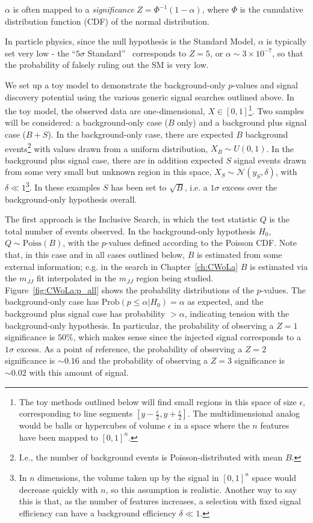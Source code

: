 $\alpha$ is often mapped to a \textit{significance} $Z=\Phi^{-1}(1-\alpha)$, where $\Phi$ is the cumulative distribution function (CDF) of the normal distribution.

In particle physics, since the null hypothesis is the Standard Model, $\alpha$ is typically set very low - the ``$5\sigma$ Standard''~\cite{Lyons:2013yja,Sinervo:2002sa} corresponds to $Z=5$, or $\alpha \sim 3\times10^{-7}$, so that the probability of falsely ruling out the SM is very low.

We set up a toy model to demonstrate the background-only $p$-values and signal discovery potential using the various generic signal searches outlined above.
In the toy model, the observed data are one-dimensional, $X \in [0,1]$\footnote{The toy methods outlined below will find small regions in this space of size $\epsilon$, corresponding to line segments $[y-\frac{\epsilon}{2},y+\frac{\epsilon}{2}]$. The multidimensional analog would be balls or hypercubes of volume $\epsilon$ in a space where the $n$ features have been mapped to $[0,1]^n$.}.
Two samples will be considered: a background-only case ($B$ only) and a background plus signal case ($B+S$).
In the background-only case, there are expected $B$ background events\footnote{I.e., the number of background events is Poisson-distributed with mean $B$.} with values drawn from a uniform distribution, $X_B\sim U(0,1)$.
In the background plus signal case, there are in addition expected $S$ signal events drawn from some very small but unknown region in this space, $X_S\sim\mathcal{N}(y_S,\delta)$, with $\delta\ll 1$\footnote{In $n$ dimensions, the volume taken up by the signal in $[0,1]^n$ space would decrease quickly with $n$, so this assumption is realistic. Another way to say this is that, as the number of features increases, a selection with fixed signal efficiency can have a background efficiency $\delta \ll 1$.}.
In these examples $S$ has been set to $\sqrt{B}$, i.e. a $1\sigma$ excess over the background-only hypothesis overall.

The first approach is the Inclusive Search, in which the test statistic $Q$ is the total number of events observed.
In the background-only hypothesis $H_0$, $Q\sim\text{Poiss}(B)$, with the $p$-values defined according to the Poisson CDF.
Note that, in this case and in all cases outlined below, $B$ is estimated from some external information; e.g. in the search in Chapter~\ref{ch:CWoLa} $B$ is estimated via the $m_{JJ}$ fit interpolated in the $m_{JJ}$ region being studied.
Figure~\ref{fig:CWoLa:p_all} shows the probability distributions of the $p$-values.
The background-only case has $\text{Prob}(p \leq \alpha | H_0) = \alpha$ as expected, and the background plus signal case has probability $>\alpha$, indicating tension with the background-only hypothesis.
In particular, the probability of observing a $Z=1$ significance is $50\%$, which makes sense since the injected signal corresponds to a $1\sigma$ excess.
As a point of reference, the probability of observing a $Z=2$ significance is $\sim 0.16$ and the probability of observing a $Z=3$ significance is $\sim 0.02$ with this amount of signal.

